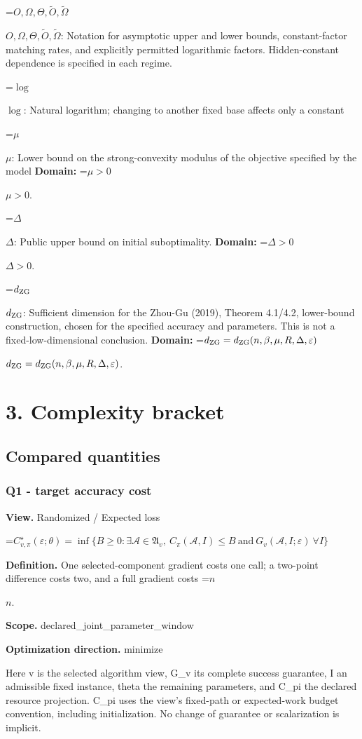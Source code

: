 \documentclass[10pt,a4paper]{article}
\newcommand{\AtlasMath}[1]{\par\begingroup\centering\setbox0=\hbox{$\displaystyle #1$}\ifdim\wd0>1.4\linewidth\typeout{ATLAS WIDE FORMULA: \the\wd0}\fi\ifdim\wd0>\linewidth\resizebox{\linewidth}{!}{\box0}\else\box0\fi\par\endgroup}
\newcommand{\AtlasInlineMath}[1]{\begingroup\setbox0=\hbox{$#1$}\ifdim\wd0>.4\linewidth\endgroup\AtlasMath{#1}\else\endgroup$#1$\fi}
\begin{document}
\AtlasInlineMath{O,\Omega,\Theta,\widetilde{O},\widetilde\Omega}: Notation for asymptotic upper and lower bounds, constant-factor matching rates, and explicitly permitted logarithmic factors. Hidden-constant dependence is specified in each regime.

\AtlasInlineMath{\log}: Natural logarithm; changing to another fixed base affects only a constant

\AtlasInlineMath{\mu}: Lower bound on the strong-convexity modulus of the objective specified by the model \textbf{Domain:} \AtlasInlineMath{\mu>0}.

\AtlasInlineMath{\Delta}: Public upper bound on initial suboptimality. \textbf{Domain:} \AtlasInlineMath{\Delta>0}.

\AtlasInlineMath{d_{\rm ZG}}: Sufficient dimension for the Zhou-Gu (2019), Theorem 4.1/4.2, lower-bound construction, chosen for the specified accuracy and parameters. This is not a fixed-low-dimensional conclusion. \textbf{Domain:} \AtlasInlineMath{d_{\rm ZG}=d_{\rm ZG}(n,\beta,\mu,R,\Delta,\varepsilon)}.

\section{3. Complexity bracket}
\subsection{Compared quantities}
\subsubsection{Q1 - target accuracy cost}
\textbf{View.} Randomized / Expected loss

\AtlasMath{C^\star_{v,\pi}(\varepsilon;\theta)=\inf\{B\ge0:\exists\mathcal A\in\mathfrak A_v,\ C_\pi(\mathcal A,I)\le B\ \text{and}\ G_v(\mathcal A,I;\varepsilon)\ \forall I\}}
\textbf{Definition.} One selected-component gradient costs one call; a two-point difference costs two, and a full gradient costs \AtlasInlineMath{n}.

\textbf{Scope.} declared\_joint\_parameter\_window

\textbf{Optimization direction.} minimize

Here v is the selected algorithm view, G\_v its complete success guarantee, I an admissible fixed instance, theta the remaining parameters, and C\_pi the declared resource projection. C\_pi uses the view's fixed-path or expected-work budget convention, including initialization. No change of guarantee or scalarization is implicit.
\end{document}
